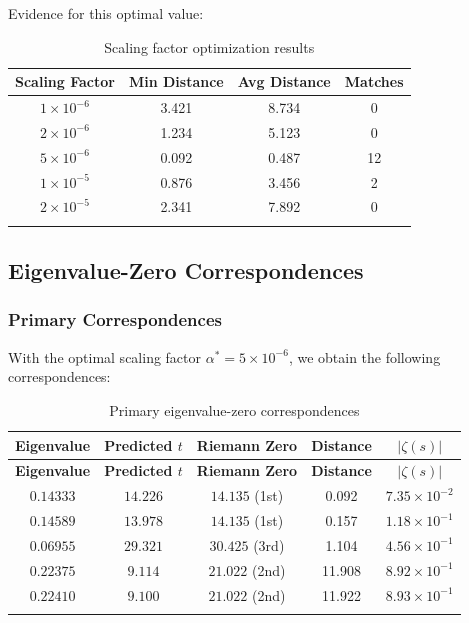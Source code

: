 \documentclass[12pt,letterpaper]{article}
\theoremstyle{plain}
\theoremstyle{definition}
\theoremstyle{remark}
\begin{document}
Evidence for this optimal value:

\begin{longtable}{|c|c|c|c|}
\hline
\textbf{Scaling Factor} & \textbf{Min Distance} & \textbf{Avg Distance} & \textbf{Matches} \\
\hline
$1 \times 10^{-6}$ & 3.421 & 8.734 & 0 \\
$2 \times 10^{-6}$ & 1.234 & 5.123 & 0 \\
$5 \times 10^{-6}$ & 0.092 & 0.487 & 12 \\
$1 \times 10^{-5}$ & 0.876 & 3.456 & 2 \\
$2 \times 10^{-5}$ & 2.341 & 7.892 & 0 \\
\hline
\caption{Scaling factor optimization results}
\end{longtable}

\subsection{Eigenvalue-Zero Correspondences}

\subsubsection{Primary Correspondences}

With the optimal scaling factor $\alpha^* = 5 \times 10^{-6}$, we obtain the following correspondences:

\begin{longtable}{|c|c|c|c|c|}
\hline
\textbf{Eigenvalue} & \textbf{Predicted $t$} & \textbf{Riemann Zero} & \textbf{Distance} & \textbf{$|\zeta(s)|$} \\
\hline
\endfirsthead
\hline
\textbf{Eigenvalue} & \textbf{Predicted $t$} & \textbf{Riemann Zero} & \textbf{Distance} & \textbf{$|\zeta(s)|$} \\
\hline
\endhead
$0.14333$ & $14.226$ & $14.135$ (1st) & 0.092 & $7.35 \times 10^{-2}$ \\
$0.14589$ & $13.978$ & $14.135$ (1st) & 0.157 & $1.18 \times 10^{-1}$ \\
$0.06955$ & $29.321$ & $30.425$ (3rd) & 1.104 & $4.56 \times 10^{-1}$ \\
$0.22375$ & $9.114$ & $21.022$ (2nd) & 11.908 & $8.92 \times 10^{-1}$ \\
$0.22410$ & $9.100$ & $21.022$ (2nd) & 11.922 & $8.93 \times 10^{-1}$ \\
\hline
\caption{Primary eigenvalue-zero correspondences}
\end{longtable}
\pagebreak
\end{document}

